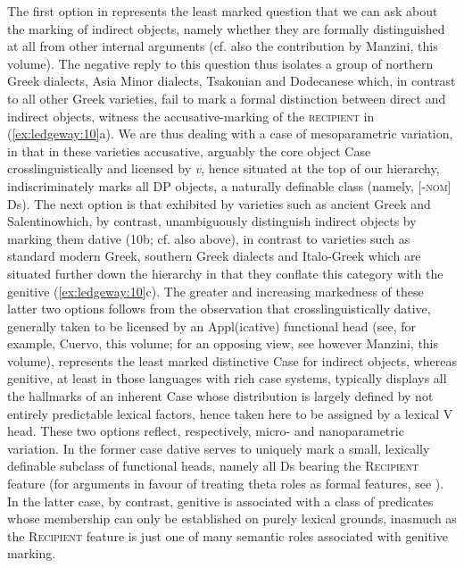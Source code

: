 \documentclass[output=paper,modfonts,nonflat]{langsci/langscibook}
\begin{document}
The first option in  represents the least marked question that we can ask about the marking of indirect objects, namely whether they are formally distinguished at all from other internal arguments (cf. also the contribution by Manzini, this volume). The negative reply to this question thus isolates a group of northern Greek dialects, Asia Minor dialects, Tsakonian and Dodecanese which, in contrast to all other Greek varieties, fail to mark a formal distinction between direct and indirect objects, witness the accusative-marking of the \textsc{recipient} in (\ref{ex:ledgeway:10}a). We are thus dealing with a case of mesoparametric variation, in that in these varieties accusative, arguably the core object Case crosslinguistically and licensed by \textit{v}, hence situated at the top of our hierarchy, indiscriminately marks all DP objects, a naturally definable class (namely, [-\textsc{nom}] Ds). The next option is that exhibited by varieties such as ancient Greek and Salentinowhich, by contrast, unambiguously distinguish indirect objects by marking them dative (10b; cf. also  above), in contrast to varieties such as standard modern Greek, southern Greek dialects and Italo-Greek which are situated further down the hierarchy in that they conflate this category with the genitive (\ref{ex:ledgeway:10}c). The greater and increasing markedness of these latter two options follows from the observation that crosslinguistically dative, generally taken to be licensed by an Appl(icative) functional head (see, for example, Cuervo, this volume; for an opposing view, see however Manzini, this volume), represents the least marked distinctive Case for indirect objects, whereas genitive, at least in those languages with rich case systems, typically displays all the hallmarks of an inherent Case whose distribution is largely defined by not entirely predictable lexical factors, hence taken here to be assigned by a lexical V head. These two options reflect, respectively, micro- and nanoparametric variation. In the former case dative serves to uniquely mark a small, lexically definable subclass of functional heads, namely all Ds bearing the \textsc{Recipient} feature (for arguments in favour of treating theta roles as formal features, see \citealt{Hornstein1999}). In the latter case, by contrast, genitive is associated with a class of predicates whose membership can only be established on purely lexical grounds, inasmuch as the \textsc{Recipient} feature is just one of many semantic roles associated with genitive marking. 
\end{document}
